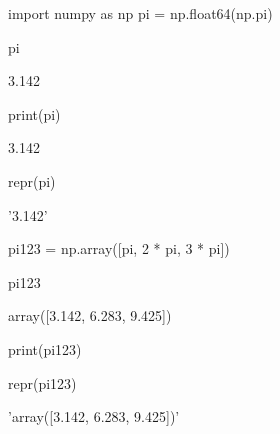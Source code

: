 \documentclass[oneside]{book}
\begin{document}
\begin{pycell}
import numpy as np
pi = np.float64(np.pi)
\end{pycell}

\begin{pycell}
pi
\end{pycell}

\begin{pyexpectedoutput}
3.142
\end{pyexpectedoutput}

\begin{pycell}
print(pi)
\end{pycell}

\begin{pyexpectedoutput}
3.142
\end{pyexpectedoutput}

\begin{pycell}
repr(pi)
\end{pycell}

\begin{pyexpectedoutput}
'3.142'
\end{pyexpectedoutput}

\begin{pycell}
pi123 = np.array([pi, 2 * pi, 3 * pi])
\end{pycell}

\begin{pycell}
pi123
\end{pycell}

\begin{pyexpectedoutput}
array([3.142, 6.283, 9.425])
\end{pyexpectedoutput}

\begin{pycell}
print(pi123)
\end{pycell}

\begin{pyexpectedoutput}
[3.142 6.283 9.425]
\end{pyexpectedoutput}

\begin{pycell}
repr(pi123)
\end{pycell}

\begin{pyexpectedoutput}
'array([3.142, 6.283, 9.425])'
\end{pyexpectedoutput}
\end{document}
